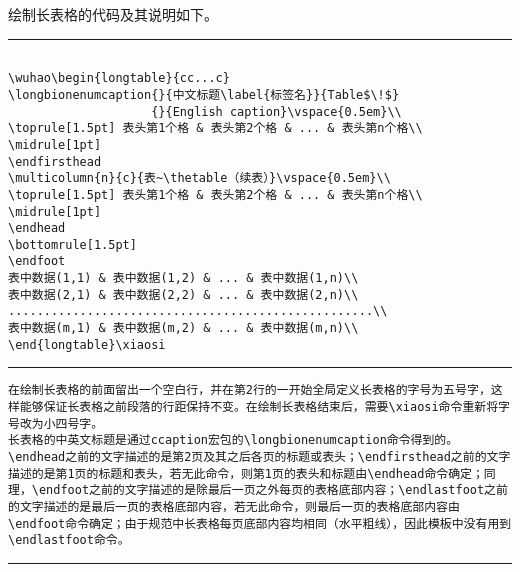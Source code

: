 绘制长表格的代码及其说明如下。
\vspace{1em}\noindent\hrule
\begin{verbatim}

\wuhao\begin{longtable}{cc...c}
\longbionenumcaption{}{中文标题\label{标签名}}{Table$\!$}
                    {}{English caption}\vspace{0.5em}\\
\toprule[1.5pt] 表头第1个格 & 表头第2个格 & ... & 表头第n个格\\ \midrule[1pt]
\endfirsthead
\multicolumn{n}{c}{表~\thetable（续表）}\vspace{0.5em}\\
\toprule[1.5pt] 表头第1个格 & 表头第2个格 & ... & 表头第n个格\\ \midrule[1pt]
\endhead
\bottomrule[1.5pt]
\endfoot
表中数据(1,1) & 表中数据(1,2) & ... & 表中数据(1,n)\\
表中数据(2,1) & 表中数据(2,2) & ... & 表中数据(2,n)\\
...................................................\\
表中数据(m,1) & 表中数据(m,2) & ... & 表中数据(m,n)\\
\end{longtable}\xiaosi
\end{verbatim}
\noindent\hrule
\begin{verbatim}
在绘制长表格的前面留出一个空白行，并在第2行的一开始全局定义长表格的字号为五号字，这样能够保证长表格之前段落的行距保持不变。在绘制长表格结束后，需要\xiaosi命令重新将字号改为小四号字。
长表格的中英文标题是通过ccaption宏包的\longbionenumcaption命令得到的。
\endhead之前的文字描述的是第2页及其之后各页的标题或表头；\endfirsthead之前的文字描述的是第1页的标题和表头，若无此命令，则第1页的表头和标题由\endhead命令确定；同理，\endfoot之前的文字描述的是除最后一页之外每页的表格底部内容；\endlastfoot之前的文字描述的是最后一页的表格底部内容，若无此命令，则最后一页的表格底部内容由\endfoot命令确定；由于规范中长表格每页底部内容均相同（水平粗线），因此模板中没有用到\endlastfoot命令。
\end{verbatim}
\noindent\hrule

